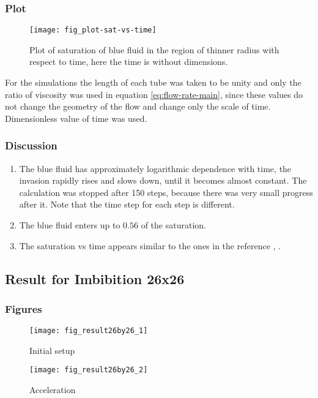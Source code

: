 	\subsubsection{Plot}
		\begin{figure}[H]
			\centering
			\texttt{[image: fig\_plot-sat-vs-time]}
			\caption{Plot of saturation of blue fluid in the region of thinner radius with respect to time, here the time is without dimensions.}
			\label{fig_plot-sat-vs-time}
		\end{figure}
		
		For the simulations the length of each tube was taken to be unity and only the ratio of viscosity was used in equation \ref{eq:flow-rate-main}, since these values do not change the geometry of the flow and change only the scale of time. Dimensionless value of time was used.
		
	\subsubsection{Discussion}
		\begin{enumerate}
			\item The blue fluid has approximately logarithmic dependence with time, the invasion rapidly rises and slows down, until it becomes almost constant. The calculation was stopped after 150 steps, because there was very small progress after it. Note that the time step for each step is different.
			\item The blue fluid enters up to $0.56$ of the saturation.
			\item The saturation vs time appears similar to the ones in the reference \cite{aker1998two}, \cite{fatt1956network}.
		\end{enumerate}

		
\subsection{Result for Imbibition 26x26}
	
	\subsubsection{Figures}
		\begin{figure}[H]
			\texttt{[image: fig\_result26by26\_1]}
			\caption{Initial setup}
		\end{figure}
		
		\begin{figure}[H]
			\texttt{[image: fig\_result26by26\_2]}
			\caption{Acceleration}
		\end{figure}
		

